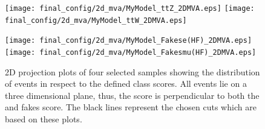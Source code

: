 \documentclass[bachelor,oneside, BCOR10mm,
			ngerman,english  %
]{GAUBM}
\begin{document}
\begin{figure}
	\centering
	\texttt{[image: final\_config/2d\_mva/MyModel\_ttZ\_2DMVA.eps]}\hspace{8mm}
	\texttt{[image: final\_config/2d\_mva/MyModel\_ttW\_2DMVA.eps]}
	
	\texttt{[image: final\_config/2d\_mva/MyModel\_Fakese(HF)\_2DMVA.eps]}\hspace{8mm}
	\texttt{[image: final\_config/2d\_mva/MyModel\_Fakesmu(HF)\_2DMVA.eps]}
	\caption{2D projection plots of four selected samples showing the distribution of events in respect to the defined class scores. All events lie on a three dimensional plane, thus, the \ttbarZ score is perpendicular to both the \ttbarW and fakes score. The black lines represent the chosen cuts which are based on these plots.}
	\label{fig:Final2DSeparationPlots}
\end{figure}
\end{document}

